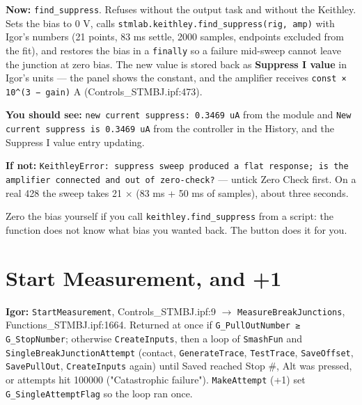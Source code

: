 \textbf{Now:} \texttt{find\_\discretionary{}{}{}suppress}. Refuses without the output task and without the Keithley. Sets the bias to 0 V, calls \texttt{stmlab.\discretionary{}{}{}keithley.\discretionary{}{}{}find\_\discretionary{}{}{}suppress(rig,\discretionary{}{}{} amp)} with Igor's numbers (21 points, 83 ms settle, 2000 samples, endpoints excluded from the fit), and restores the bias in a \texttt{finally} so a failure mid-sweep cannot leave the junction at zero bias. The new value is stored back as \textbf{Suppress I value} in Igor's units --- the panel shows the constant, and the amplifier receives \texttt{const × 10\textasciicircum{}(3 − gain)} \textmu{}A (Controls\_STMBJ.ipf:473).

\textbf{You should see:} \texttt{new current suppress: 0.\discretionary{}{}{}3469 u\discretionary{}{}{}A} from the module and \texttt{New current suppress is 0.\discretionary{}{}{}3469 u\discretionary{}{}{}A} from the controller in the History, and the Suppress I value entry updating.

\textbf{If not:} \texttt{Keithley\discretionary{}{}{}Error: suppress sweep produced a flat response; is the amplifier connected and out of zero-check?} --- untick Zero Check first. On a real 428 the sweep takes 21 $\times$ (83 ms + 50 ms of samples), about three seconds.

\begin{keybox}
Zero the bias yourself if you call \texttt{keithley.\discretionary{}{}{}find\_\discretionary{}{}{}suppress} from a script: the function does not know what bias you wanted back. The button does it for you.
\end{keybox}

\section{Start Measurement, and +1}

\textbf{Igor:} \texttt{Start\discretionary{}{}{}Measurement}, Controls\_STMBJ.ipf:9 $\rightarrow$ \texttt{Measure\discretionary{}{}{}Break\discretionary{}{}{}Junctions}, Functions\_STMBJ.ipf:1664. Returned at once if \texttt{G\_\discretionary{}{}{}Pull\discretionary{}{}{}Out\discretionary{}{}{}Number ≥ G\_\discretionary{}{}{}Stop\discretionary{}{}{}Number}; otherwise \texttt{Create\discretionary{}{}{}Inputs}, then a loop of \texttt{Smash\discretionary{}{}{}Fun} and \texttt{Single\discretionary{}{}{}Break\discretionary{}{}{}Junction\discretionary{}{}{}Attempt} (contact, \texttt{Generate\discretionary{}{}{}Trace}, \texttt{Test\discretionary{}{}{}Trace}, \texttt{Save\discretionary{}{}{}Offset}, \texttt{Save\discretionary{}{}{}Pull\discretionary{}{}{}Out}, \texttt{Create\discretionary{}{}{}Inputs} again) until Saved reached Stop \#, Alt was pressed, or attempts hit 100000 ("Catastrophic failure"). \texttt{Make\discretionary{}{}{}Attempt} (+1) set \texttt{G\_\discretionary{}{}{}Single\discretionary{}{}{}Attempt\discretionary{}{}{}Flag} so the loop ran once.

